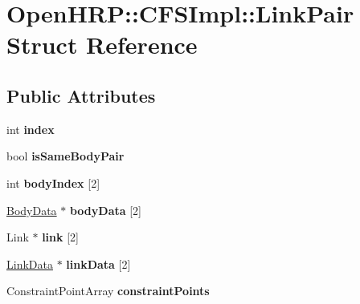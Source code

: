 \hypertarget{structOpenHRP_1_1CFSImpl_1_1LinkPair}{\section{Open\-H\-R\-P\-:\-:C\-F\-S\-Impl\-:\-:Link\-Pair Struct Reference}
\label{structOpenHRP_1_1CFSImpl_1_1LinkPair}
}
\subsection*{Public Attributes}
\begin{DoxyCompactItemize}
\item 
\hypertarget{structOpenHRP_1_1CFSImpl_1_1LinkPair_a09c42e4d7acaca4f5221c33858a5eaf6}{int {\bfseries index}}\label{structOpenHRP_1_1CFSImpl_1_1LinkPair_a09c42e4d7acaca4f5221c33858a5eaf6}

\item 
\hypertarget{structOpenHRP_1_1CFSImpl_1_1LinkPair_a8653c3c7af8dcc93d497d71b8e4ef0d4}{bool {\bfseries is\-Same\-Body\-Pair}}\label{structOpenHRP_1_1CFSImpl_1_1LinkPair_a8653c3c7af8dcc93d497d71b8e4ef0d4}

\item 
\hypertarget{structOpenHRP_1_1CFSImpl_1_1LinkPair_a6e55e738107fa2c09fdfe7debdcb9a06}{int {\bfseries body\-Index} \mbox{[}2\mbox{]}}\label{structOpenHRP_1_1CFSImpl_1_1LinkPair_a6e55e738107fa2c09fdfe7debdcb9a06}

\item 
\hypertarget{structOpenHRP_1_1CFSImpl_1_1LinkPair_a2dbf8cc0babcdcc94f5eaac796afe9d1}{\hyperlink{structOpenHRP_1_1CFSImpl_1_1BodyData}{Body\-Data} $\ast$ {\bfseries body\-Data} \mbox{[}2\mbox{]}}\label{structOpenHRP_1_1CFSImpl_1_1LinkPair_a2dbf8cc0babcdcc94f5eaac796afe9d1}

\item 
\hypertarget{structOpenHRP_1_1CFSImpl_1_1LinkPair_ab2735b6201cb0d7aace0e646eabe36d2}{Link $\ast$ {\bfseries link} \mbox{[}2\mbox{]}}\label{structOpenHRP_1_1CFSImpl_1_1LinkPair_ab2735b6201cb0d7aace0e646eabe36d2}

\item 
\hypertarget{structOpenHRP_1_1CFSImpl_1_1LinkPair_aa30c2d83bec055bdfb182222857a7d3f}{\hyperlink{structOpenHRP_1_1CFSImpl_1_1LinkData}{Link\-Data} $\ast$ {\bfseries link\-Data} \mbox{[}2\mbox{]}}\label{structOpenHRP_1_1CFSImpl_1_1LinkPair_aa30c2d83bec055bdfb182222857a7d3f}

\item 
\hypertarget{structOpenHRP_1_1CFSImpl_1_1LinkPair_a78ae8f94fa5c18612d2f2cef2d8ea43f}{Constraint\-Point\-Array {\bfseries constraint\-Points}}\label{structOpenHRP_1_1CFSImpl_1_1LinkPair_a78ae8f94fa5c18612d2f2cef2d8ea43f}


\end{DoxyCompactItemize}
